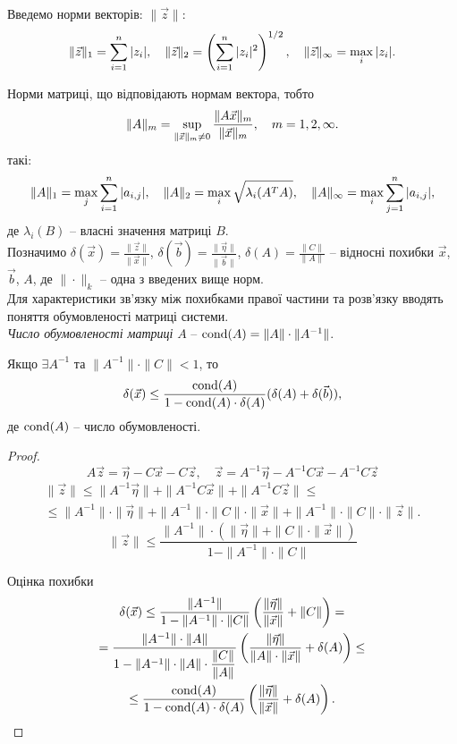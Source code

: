Введемо норми векторів: $\|\vec z\|$:
\[ \|\vec z\|_1 = \displaystyle\sum\limits_{i=1}^n |z_i|, \quad \|\vec z\|_2 = \left(\displaystyle\sum\limits_{i=1}^n |z_i|^2\right)^{1/2}, \quad \|\vec z\|_\infty = \displaystyle\max\limits_i |z_i|. \]

Норми матриці, що відповідають нормам вектора, тобто
\[ \|A\|_m = \displaystyle\sup\limits_{\|\vec x\|_m \ne 0} \dfrac{\|A\vec x\|_m}{\|\vec x\|_m}, \quad m=1,2,\infty. \]
такі: \[ \|A\|_1 = \displaystyle\max\limits_j \displaystyle\sum\limits_{i=1}^n |a_{i,j}|, \quad \|A\|_2 = \displaystyle\max\limits_i \sqrt{\lambda_i (A^TA)}, \quad \|A\|_\infty = \displaystyle\max\limits_i \displaystyle\sum\limits_{j=1}^n |a_{i,j}|, \]
де $\lambda_i(B)$ -- власні значення матриці $B$. \\

Позначимо $\delta(\vec x) = \frac{\|\vec z\|}{\|\vec x\|}$, $\delta(\vec b) = \frac{\|\vec \eta\|}{\|\vec b\|}$, $\delta(A) = \frac{\|C\|}{\|A\|}$ -- відносні похибки $\vec x$, $\vec b$, $A$, де $\|\cdot\|_k$ -- одна з введених вище норм. \\

Для характеристики зв'язку між похибками правої частини та розв'язку вводять поняття обумовленості матриці системи. \\

\textit{Число обумовленості матриці} $A$ -- $\operatorname{cond} (A) = \|A\|\cdot\|A^{-1}\|$.

\begin{theorem}
	Якщо $\exists A^{-1}$ та $\|A^{-1}\|\cdot\|C\|<1$, то
	\begin{equation}
		\label{eq:3.25}
		\delta(\vec x) \le \dfrac{\operatorname{cond} (A)}{1-\operatorname{cond} (A)\cdot\delta(A)}(\delta(A)+\delta(\vec b)),
	\end{equation}
	де $\operatorname{cond} (A)$ -- число обумовленості.
\end{theorem}
\begin{proof}
	\[A \vec z = \vec \eta - C \vec x - C \vec z, \quad \vec z = A^{-1} \vec \eta - A^{-1} C \vec x - A^{-1} C \vec z\]
	\begin{multline*} 
		\|\vec z\| \le \|A^{-1}\vec \eta\|+\|A^{-1}C\vec x\| +\|A^{-1}C\vec z\| \le \\
		\le \|A^{-1}\|\cdot\|\vec \eta\|+\|A^{-1}\|\cdot \|C\|\cdot \|\vec x\| +\|A^{-1}\|\cdot \|C\|\cdot \|\vec z\|.
	\end{multline*}
	\[ \|\vec z\| \le \dfrac{\|A^{-1}\|\cdot(\|\vec\eta\|+\|C\|\cdot\|\vec x\|)}{1 - \|A^{-1}\| \cdot \|C\|} \]

	Оцінка похибки
	\begin{multline*}
		\delta(\vec x) \le \dfrac{\|A^{-1}\|}{1-\|A^{-1}\| \cdot \|C\|} \left(\dfrac{\|\vec \eta\|}{\|\vec x\|}+\|C\| \right) = \\
		= \dfrac{\|A^{-1}\|\cdot \|A\|}{1-\|A^{-1}\|\cdot\|A\|\cdot \dfrac{\|C\|}{\|A\|}} \left(\dfrac{\|\vec \eta\|}{\|A\|\cdot \|\vec x\|} + \delta(A) \right) \le \\
		\le \dfrac{\operatorname{cond} (A)}{1-\operatorname{cond}(A)\cdot\delta(A)}\left(\dfrac{\|\vec\eta\|}{\|\vec x\|}+\delta(A)\right).
	\end{multline*}
\end{proof}


